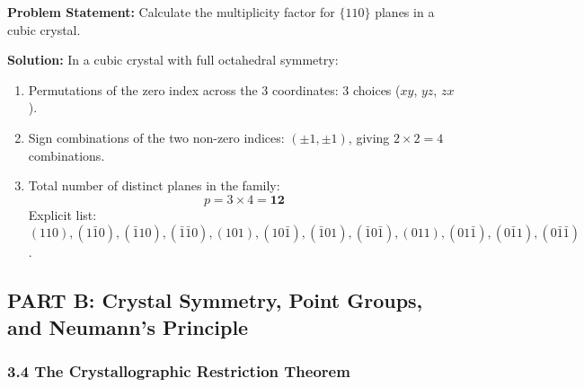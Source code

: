 \documentclass[11pt,a4paper]{article}
\begin{document}
\begin{solbox}
\textbf{Problem Statement:} Calculate the multiplicity factor for $\{110\}$ planes in a cubic crystal.

\textbf{Solution:}
In a cubic crystal with full octahedral symmetry:
\begin{enumerate}
    \item Permutations of the zero index across the 3 coordinates: 3 choices ($xy$, $yz$, $zx$).
    \item Sign combinations of the two non-zero indices: $(\pm 1, \pm 1)$, giving $2 \times 2 = 4$ combinations.
    \item Total number of distinct planes in the family:
    \begin{equation}
    p = 3 \times 4 = \mathbf{12}
    \end{equation}
    Explicit list: $(110), (1\bar{1}0), (\bar{1}10), (\bar{1}\bar{1}0), (101), (10\bar{1}), (\bar{1}01), (\bar{1}0\bar{1}), (011), (01\bar{1}), (0\bar{1}1), (0\bar{1}\bar{1})$.
\end{enumerate}
\end{solbox}

\subsection{PART B: Crystal Symmetry, Point Groups, and Neumann's Principle}

\subsubsection{3.4 The Crystallographic Restriction Theorem}
\end{document}
